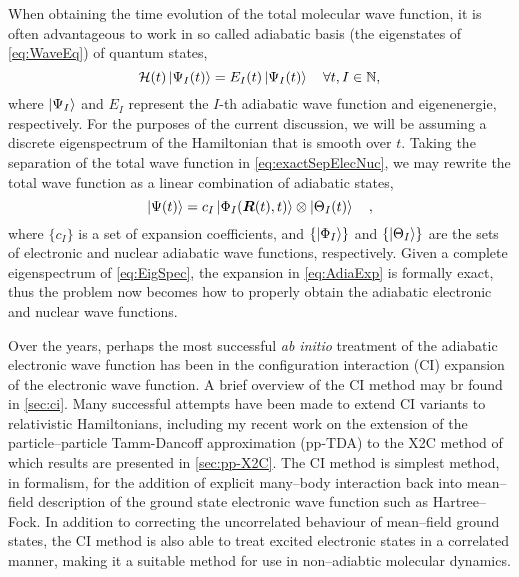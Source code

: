 When obtaining the time evolution of the total molecular wave function, it is
often advantageous to work in so called adiabatic basis (the eigenstates of
\cref{eq:WaveEq}) of quantum states,
\begin{equation}
\mathcal{H}(t) \left\vert \Psi_I (t) \right\rangle = E_I(t) \left\vert \Psi_I (t) \right\rangle
\quad \forall t, I \in \mathbb{N},
\label{eq:EigSpec}
\end{equation}
where $\left\vert \Psi_I \right\rangle$ and $E_I$ represent the $I$-th adiabatic wave function and
eigenenergie, respectively. For the purposes of the current discussion, we will
be assuming a discrete eigenspectrum of the Hamiltonian that is smooth over $t$.
Taking the separation of the total wave function in \cref{eq:exactSepElecNuc},
we may rewrite the total wave function as a linear combination of adiabatic
states,
\begin{equation}
\left\vert \Psi (t) \right\rangle = c_I \left\vert \Phi_I (\boldsymbol{R}(t),t) \right\rangle \otimes \left\vert \Theta_I (t) \right\rangle
\quad ,
\label{eq:AdiaExp}
\end{equation}
where $\{ c_I \}$ is a set of expansion coefficients, and $\{\left\vert \Phi_I \right\rangle\}$ and
$\{\left\vert \Theta_I \right\rangle\}$ are the sets of electronic and nuclear adiabatic wave
functions, respectively. Given a complete eigenspectrum of \cref{eq:EigSpec},
the expansion in \cref{eq:AdiaExp} is formally exact, thus the problem now
becomes how to properly obtain the adiabatic electronic and nuclear wave
functions.

Over the years, perhaps the most successful \emph{ab initio} treatment of the
adiabatic electronic wave function has been in the configuration interaction
(CI) expansion of the electronic wave function. A brief overview of the CI
method may br found in \cref{sec:ci}.  Many successful attempts have been made
to extend CI variants to relativistic Hamiltonians\cite{Neese13_JCP104113,
Olsen97_TCA125, Jensen96_JCP4083}, including my recent work on the extension of
the particle--particle Tamm-Dancoff approximation (pp-TDA) to the X2C method
\cite{DBWY16_Accepted1} of which results are presented in \cref{sec:pp-X2C}. The
CI method is simplest method, in formalism, for the addition of explicit
many--body interaction back into mean--field description of the ground state
electronic wave function such as Hartree--Fock. In addition to correcting the
uncorrelated behaviour of mean--field ground states, the CI method is also able
to treat excited electronic states in a correlated manner, making it a suitable
method for use in non--adiabtic molecular dynamics.

